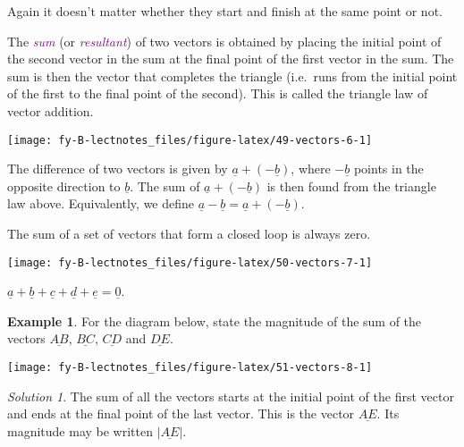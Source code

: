 \documentclass[
  english,
  11pt,
  oneside]{book}
\newcommand{\slide}{}
\theoremstyle{definition}
\theoremstyle{definition}
\newtheorem{example}{Example}[chapter]
\theoremstyle{definition}
\theoremstyle{definition}
\theoremstyle{remark}
\newtheorem*{solution}{Solution}
\begin{document}
Again it doesn't matter whether they start and finish at the same point or not.

\slide

The \textcolor{purple}{\em sum} (or \textcolor{purple}{\em resultant}) of two vectors is obtained by placing the initial point of the second vector in the sum at the final point of the first vector in the sum. The sum is then the vector that completes the triangle (i.e.~runs from the initial point of the first to the final point of the second). This is called the triangle law of vector addition.

\begin{center}\texttt{[image: fy-B-lectnotes\_files/figure-latex/49-vectors-6-1]} \end{center}

The difference of two vectors is given by \(\underline a + (-\underline b)\), where \(-\underline b\) points in the opposite direction to \(\underline b\). The sum of \(\underline a + (-\underline b)\) is then found from the triangle law above. Equivalently, we define \(\underline a-\underline b = \underline a + (-\underline b)\).

\slide

The sum of a set of vectors that form a closed loop is always zero.

\begin{center}\texttt{[image: fy-B-lectnotes\_files/figure-latex/50-vectors-7-1]} \end{center}

\(\underline a + \underline b + \underline c + \underline d + \underline e = \underline 0\).

\slide

\begin{example}

For the diagram below, state the magnitude of the sum of the vectors \(\underline{AB}\), \(\underline{BC}\), \(\underline{CD}\) and \(\underline{DE}\).

\begin{center}\texttt{[image: fy-B-lectnotes\_files/figure-latex/51-vectors-8-1]} \end{center}

\end{example}

\begin{solution}
The sum of all the vectors starts at the initial point of the first vector and ends at the final point of the last vector. This is the vector \(\underline{AE}\). Its magnitude may be written \(|\underline{AE}|\).
\end{solution}
\end{document}
